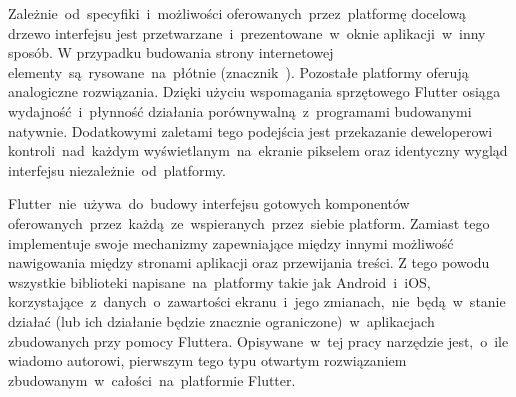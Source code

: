 Zależnie~od~specyfiki~i~możliwości oferowanych~przez~platformę docelową drzewo interfejsu jest przetwarzane~i~prezentowane~w~oknie aplikacji~w~inny sposób. W przypadku budowania strony internetowej elementy~są~rysowane~na~płótnie (znacznik~). Pozostałe platformy oferują analogiczne rozwiązania. Dzięki użyciu wspomagania sprzętowego Flutter osiąga wydajność~i~płynność działania porównywalną~z~programami budowanymi natywnie. Dodatkowymi zaletami tego podejścia jest przekazanie deweloperowi kontroli~nad~każdym wyświetlanym~na~ekranie pikselem oraz identyczny wygląd interfejsu niezależnie~od~platformy.

Flutter~nie~używa~do~budowy interfejsu gotowych komponentów oferowanych~przez~każdą~ze~wspieranych~przez~siebie platform. Zamiast tego implementuje swoje mechanizmy zapewniające między innymi możliwość nawigowania między stronami aplikacji oraz przewijania treści. Z tego powodu wszystkie biblioteki napisane~na~platformy takie jak Android~i~iOS, korzystające~z~danych~o~zawartości ekranu~i~jego zmianach,~nie~będą~w~stanie działać (lub ich działanie będzie znacznie ograniczone)~w~aplikacjach zbudowanych przy pomocy Fluttera. Opisywane~w~tej pracy narzędzie jest,~o~ile wiadomo autorowi, pierwszym tego typu otwartym rozwiązaniem zbudowanym~w~całości~na~platformie Flutter.


